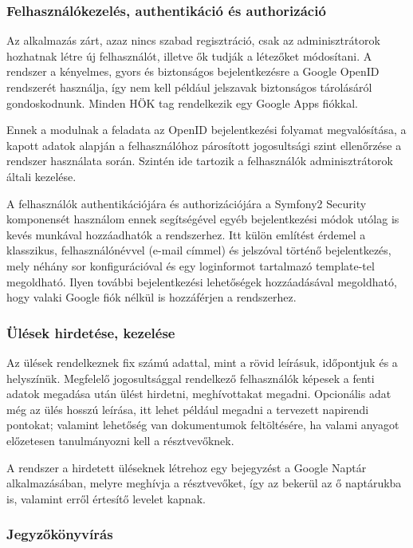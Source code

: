 \documentclass[a4paper,12pt,oneside]{report}
\begin{document}
\subsubsection{Felhasználókezelés, authentikáció és authorizáció}

Az alkalmazás zárt, azaz nincs szabad regisztráció, csak az adminisztrátorok hozhatnak létre új felhasználót, illetve ők tudják a létezőket módosítani. A rendszer a kényelmes, gyors és biztonságos bejelentkezésre a Google OpenID rendszerét használja, így nem kell például jelszavak biztonságos tárolásáról gondoskodnunk. Minden HÖK tag rendelkezik egy Google Apps fiókkal.

Ennek a modulnak a feladata az OpenID bejelentkezési folyamat megvalósítása, a kapott adatok alapján a felhasználóhoz párosított jogosultsági szint ellenőrzése a rendszer használata során. Szintén ide tartozik a felhasználók adminisztrátorok általi kezelése.

A felhasználók authentikációjára és authorizációjára a Symfony2 Security komponensét használom \textendash{} ennek segítségével egyéb bejelentkezési módok utólag is kevés munkával hozzáadhatók a rendszerhez. Itt külön említést érdemel a klasszikus, felhasználónévvel (e-mail címmel) és jelszóval történő bejelentkezés, mely néhány sor konfigurációval és egy loginformot tartalmazó template-tel megoldható. Ilyen további bejelentkezési lehetőségek hozzáadásával megoldható, hogy valaki Google fiók nélkül is hozzáférjen a rendszerhez.

\subsubsection{Ülések hirdetése, kezelése}

Az ülések rendelkeznek fix számú adattal, mint a rövid leírásuk, időpontjuk és a helyszínük. Megfelelő jogosultsággal rendelkező felhasználók képesek a fenti adatok megadása után ülést hirdetni, meghívottakat megadni. Opcionális adat még az ülés hosszú leírása, itt lehet például megadni a tervezett napirendi pontokat; valamint lehetőség van dokumentumok feltöltésére, ha valami anyagot előzetesen tanulmányozni kell a résztvevőknek.

A rendszer a hirdetett üléseknek létrehoz egy bejegyzést a Google Naptár alkalmazásában, melyre meghívja a résztvevőket, így az bekerül az ő naptárukba is, valamint erről értesítő levelet kapnak.

\subsubsection{Jegyzőkönyvírás}
\end{document}

